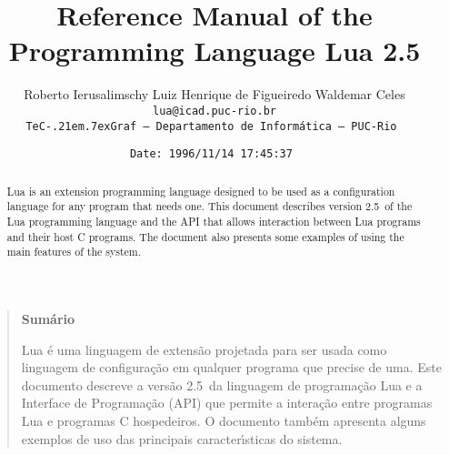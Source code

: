 

\newcommand{\rw}[1]{{\bf #1}}
\newcommand{\see}[1]{see Section~\ref{#1}}
\newcommand{\nil}{{\bf nil}}
\newcommand{\Line}{\rule{\linewidth}{.5mm}}
\def\tecgraf{{\sf TeC\kern-.21em\lower.7ex\hbox{Graf}}}

\newcommand{\Index}[1]{#1\index{#1}}
\newcommand{\IndexVerb}[1]{{\tt #1}\index{#1}}
\newcommand{\Def}[1]{{\em #1}\index{#1}}
\newcommand{\Deffunc}[1]{\index{#1}}

\newcommand{\ff}{$\bullet$\ }

\newcommand{\Version}{2.5}

\makeindex



\title{Reference Manual of the Programming Language Lua \Version}

\author{%
Roberto Ierusalimschy\quad
Luiz Henrique de Figueiredo\quad
Waldemar Celes
\vspace{1.0ex}\\
\smallskip
\small\tt lua@icad.puc-rio.br
\vspace{2.0ex}\\
\tecgraf\ --- Departamento de Inform\'atica --- PUC-Rio
}

\date{\small \verb$Date: 1996/11/14 17:45:37 $}

\maketitle

\begin{abstract}
\noindent
Lua is an extension programming language designed to be used
as a configuration language for any program that needs one.
This document describes version \Version\ of the Lua programming language and
the API that allows interaction between Lua programs and their host C programs.
The document also presents some examples of using the main
features of the system.
\end{abstract}

\vspace{4ex}
\begin{quotation}
\small
\begin{center}{\bf Sum\'ario}\end{center}
\vspace{1ex}
\noindent
Lua \'e uma linguagem de extens\~ao projetada para ser usada como
linguagem de configura\c{c}\~ao em qualquer programa que precise de
uma.
Este documento descreve a vers\~ao \Version\ da linguagem de
programa\c{c}\~ao Lua e a Interface de Programa\c{c}\~ao (API) que permite
a intera\c{c}\~ao entre programas Lua e programas C hospedeiros.
O documento tamb\'em apresenta alguns exemplos de uso das principais
ca\-racte\-r\'{\i}sticas do sistema.
\end{quotation}


